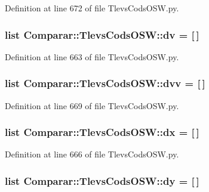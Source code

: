 \-Definition at line 672 of file \-Tlevs\-Cods\-O\-S\-W.\-py.

\subsubsection[{dv}]{\setlength{\rightskip}{0pt plus 5cm}list {\bf \-Comparar\-::\-Tlevs\-Cods\-O\-S\-W\-::dv} = [$\,$]}\label{namespace_comparar_1_1_tlevs_cods_o_s_w_a25b0a62ac5cd277d13af636221d0c3b3}


\-Definition at line 663 of file \-Tlevs\-Cods\-O\-S\-W.\-py.

\subsubsection[{dvv}]{\setlength{\rightskip}{0pt plus 5cm}list {\bf \-Comparar\-::\-Tlevs\-Cods\-O\-S\-W\-::dvv} = [$\,$]}\label{namespace_comparar_1_1_tlevs_cods_o_s_w_ac1f107b08569a2892bf4f25463982276}


\-Definition at line 669 of file \-Tlevs\-Cods\-O\-S\-W.\-py.

\subsubsection[{dx}]{\setlength{\rightskip}{0pt plus 5cm}list {\bf \-Comparar\-::\-Tlevs\-Cods\-O\-S\-W\-::dx} = [$\,$]}\label{namespace_comparar_1_1_tlevs_cods_o_s_w_ac674ac6e1d533a5fda250de97499ddc1}


\-Definition at line 666 of file \-Tlevs\-Cods\-O\-S\-W.\-py.

\subsubsection[{dy}]{\setlength{\rightskip}{0pt plus 5cm}list {\bf \-Comparar\-::\-Tlevs\-Cods\-O\-S\-W\-::dy} = [$\,$]}\label{namespace_comparar_1_1_tlevs_cods_o_s_w_ae3eb3943f7c7f1ff35d72ccc15e9fef4}


